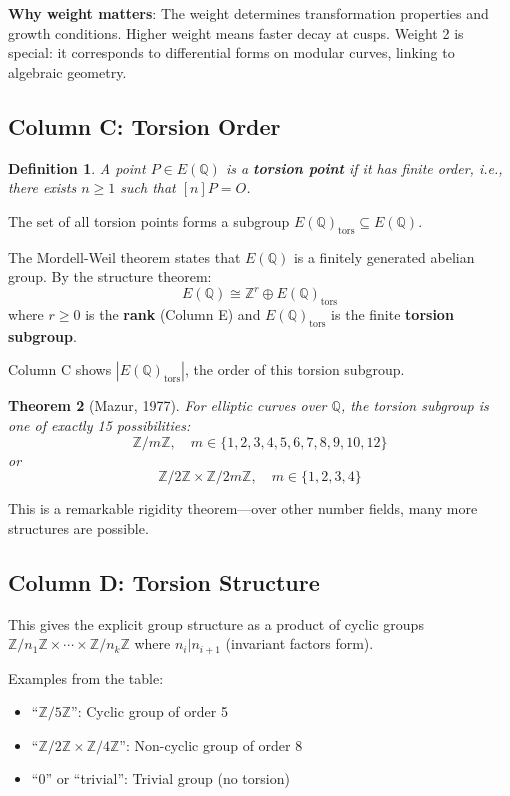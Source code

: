 \documentclass[11pt]{article}
\newtheorem{theorem}{Theorem}
\newtheorem{definition}[theorem]{Definition}
\begin{document}
\textbf{Why weight matters}: The weight determines transformation properties and growth conditions. Higher weight means faster decay at cusps. Weight 2 is special: it corresponds to differential forms on modular curves, linking to algebraic geometry.

\subsection{Column C: Torsion Order}

\begin{definition}
A point $P \in E(\mathbb{Q})$ is a \textbf{torsion point} if it has finite order, i.e., there exists $n \geq 1$ such that $[n]P = O$.
\end{definition}

The set of all torsion points forms a subgroup $E(\mathbb{Q})_{\text{tors}} \subseteq E(\mathbb{Q})$.

The Mordell-Weil theorem states that $E(\mathbb{Q})$ is a finitely generated abelian group. By the structure theorem:
$$E(\mathbb{Q}) \cong \mathbb{Z}^r \oplus E(\mathbb{Q})_{\text{tors}}$$
where $r \geq 0$ is the \textbf{rank} (Column E) and $E(\mathbb{Q})_{\text{tors}}$ is the finite \textbf{torsion subgroup}.

Column C shows $|E(\mathbb{Q})_{\text{tors}}|$, the order of this torsion subgroup.

\begin{theorem}[Mazur, 1977]
For elliptic curves over $\mathbb{Q}$, the torsion subgroup is one of exactly 15 possibilities:
$$\mathbb{Z}/m\mathbb{Z}, \quad m \in \{1,2,3,4,5,6,7,8,9,10,12\}$$
or
$$\mathbb{Z}/2\mathbb{Z} \times \mathbb{Z}/2m\mathbb{Z}, \quad m \in \{1,2,3,4\}$$
\end{theorem}

This is a remarkable rigidity theorem---over other number fields, many more structures are possible.

\subsection{Column D: Torsion Structure}

This gives the explicit group structure as a product of cyclic groups $\mathbb{Z}/n_1\mathbb{Z} \times \cdots \times \mathbb{Z}/n_k\mathbb{Z}$ where $n_i | n_{i+1}$ (invariant factors form).

Examples from the table:
\begin{itemize}
\item ``$\mathbb{Z}/5\mathbb{Z}$'': Cyclic group of order 5
\item ``$\mathbb{Z}/2\mathbb{Z} \times \mathbb{Z}/4\mathbb{Z}$'': Non-cyclic group of order 8
\item ``0'' or ``trivial'': Trivial group (no torsion)
\end{itemize}
\end{document}
